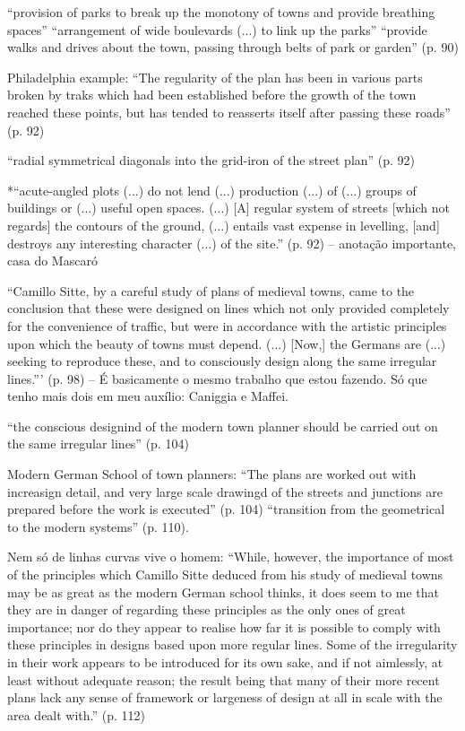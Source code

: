 \documentclass[12pt, a4paper]{book} %
\begin{document}
        ``provision of parks to break up the monotony of towns and provide breathing spaces''
        ``arrangement of wide boulevards (...) to link up the parks''
        ``provide walks and drives about the town, passing through belts of park or garden'' (p. 90)

        Philadelphia example: ``The regularity of the plan has been in various parts broken by traks which had been established before the growth of the town reached these points, but has tended to reasserts itself after passing these roads'' (p. 92)

        ``radial symmetrical diagonals into the grid-iron of the street plan'' (p. 92)

        *``acute-angled plots (...) do not lend (...) production (...) of (...) groups of buildings or (...) useful open spaces. (...) [A] regular system of streets [which not regards] the contours of the ground, (...) entails vast expense in levelling, [and] destroys any interesting character (...) of the site.'' (p. 92) – anotação importante, casa do Mascaró

        ``Camillo Sitte, by a careful study of plans of medieval towns, came to the conclusion that these were designed on lines which not only provided completely for the convenience of traffic, but were in accordance with the artistic principles upon which the beauty of towns must depend. (...) [Now,] the Germans are (...) seeking to reproduce these, and to consciously design along the same irregular lines.''' (p. 98) – É basicamente o mesmo trabalho que estou fazendo. Só que tenho mais dois em meu auxílio: Caniggia e Maffei.

        ``the conscious designind of the modern town planner should be carried out on the same irregular lines'' (p. 104)

        Modern German School of town planners: ``The plans are worked out with increasign detail, and very large scale drawingd of the streets and junctions are prepared before the work is executed'' (p. 104)
        ``transition from the geometrical to the modern systems'' (p. 110).

        Nem só de linhas curvas vive o homem: ``While, however, the importance of most of the principles which Camillo Sitte deduced from his study of medieval towns may be as great as the modern German school thinks, it does seem to me that they are in danger of regarding these principles as the only ones of great importance; nor do they appear to realise how far it is possible to comply with these principles in designs based upon more regular lines. Some of the irregularity in their work appears to be introduced for its own sake, and if not aimlessly, at least without adequate reason; the result being that many of their more recent plans lack any sense of framework or largeness of design at all in scale with the area dealt with.'' (p. 112)
\end{document}
